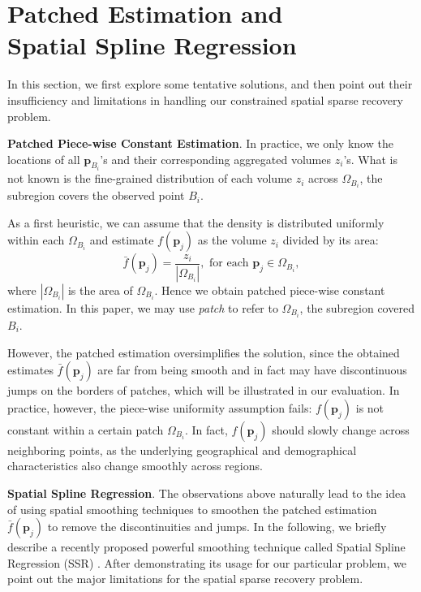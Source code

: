\section{Patched Estimation and\\ Spatial Spline Regression}
\label{sec:SSR}
In this section, we first explore some tentative solutions, and then point out their insufficiency and limitations in handling our constrained spatial sparse recovery problem.

\textbf{Patched Piece-wise Constant Estimation}.
In practice, we only know the locations of all $\mathbf p_{B_i}$'s and their corresponding aggregated volumes $z_i$'s. What is not known is the fine-grained distribution of each volume $z_i$ across $\Omega_{B_i}$, the subregion covers the observed point  $B_i$.

As a first heuristic, we can assume that the density is  distributed uniformly within each $\Omega_{B_i}$ and estimate $f(\mathbf p_j)$ as the volume $z_i$ divided by its area:
\begin{equation}\label{eq:patched}
	\bar f(\mathbf p_j) = \frac{z_i}{|\Omega_{B_i}|}, \text{ for each }\mathbf p_j \in \Omega_{B_i},
\end{equation}
where $|\Omega_{B_i}|$ is the area of $\Omega_{B_i}$.
Hence we obtain patched piece-wise constant estimation. In this paper, we may use {\it patch} to refer to $\Omega_{B_i}$, the subregion covered $B_i$. 

However, the patched estimation oversimplifies the solution, since the obtained estimates $\bar f(\mathbf p_j)$ are far from being smooth and in fact may have discontinuous jumps on the borders of patches, which will be illustrated in our evaluation. %
In practice, however, the piece-wise uniformity assumption fails: $f(\mathbf p_j)$ is not constant within a certain patch $\Omega_{B_i}$. In fact, $f(\mathbf p_j)$ should slowly change across neighboring points, as the underlying geographical and demographical characteristics also change smoothly across  regions.

\textbf{Spatial Spline Regression}.
The observations above naturally lead to the idea of using spatial smoothing techniques to smoothen the patched estimation $\bar f(\mathbf p_j)$ to remove the discontinuities and jumps. In the following, we briefly describe a recently proposed powerful smoothing technique called Spatial Spline Regression (SSR) \cite{Sanga13}. After demonstrating its usage for our particular problem, we point out the major limitations for the spatial sparse recovery problem.


